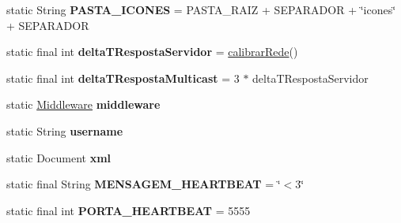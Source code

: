 \begin{DoxyCompactItemize}
\item 
\hypertarget{classutils_1_1_painel_de_controle_ab483c922061c70265c2c0833fcb01e33}{static String {\bfseries P\+A\+S\+T\+A\+\_\+\+I\+C\+O\+N\+E\+S} = P\+A\+S\+T\+A\+\_\+\+R\+A\+I\+Z + S\+E\+P\+A\+R\+A\+D\+O\+R + \char`\"{}icones\char`\"{} + S\+E\+P\+A\+R\+A\+D\+O\+R}\label{classutils_1_1_painel_de_controle_ab483c922061c70265c2c0833fcb01e33}

\item 
\hypertarget{classutils_1_1_painel_de_controle_a41ce364ac6729305e4d786d31bd540c4}{static final int {\bfseries delta\+T\+Resposta\+Servidor} = \hyperlink{classutils_1_1_painel_de_controle_a99106f0d6ede35fca232cb2af6c0f424}{calibrar\+Rede}()}\label{classutils_1_1_painel_de_controle_a41ce364ac6729305e4d786d31bd540c4}

\item 
\hypertarget{classutils_1_1_painel_de_controle_a447f2b71ddeeca09a6ab84af98d55b74}{static final int {\bfseries delta\+T\+Resposta\+Multicast} = 3 $\ast$ delta\+T\+Resposta\+Servidor}\label{classutils_1_1_painel_de_controle_a447f2b71ddeeca09a6ab84af98d55b74}

\item 
\hypertarget{classutils_1_1_painel_de_controle_a11d6a2a5de2be52c653d765cdb862945}{static \hyperlink{classmiddleware_1_1_middleware}{Middleware} {\bfseries middleware}}\label{classutils_1_1_painel_de_controle_a11d6a2a5de2be52c653d765cdb862945}

\item 
\hypertarget{classutils_1_1_painel_de_controle_a9c73df775a21b9be24006d69f40addca}{static String {\bfseries username}}\label{classutils_1_1_painel_de_controle_a9c73df775a21b9be24006d69f40addca}

\item 
\hypertarget{classutils_1_1_painel_de_controle_a3950f2120c605d1a5298673cba8454c6}{static Document {\bfseries xml}}\label{classutils_1_1_painel_de_controle_a3950f2120c605d1a5298673cba8454c6}

\item 
\hypertarget{classutils_1_1_painel_de_controle_ae38e482d2405159a25f7f355b4cda343}{static final String {\bfseries M\+E\+N\+S\+A\+G\+E\+M\+\_\+\+H\+E\+A\+R\+T\+B\+E\+A\+T} = \char`\"{}$<$3\char`\"{}}\label{classutils_1_1_painel_de_controle_ae38e482d2405159a25f7f355b4cda343}

\item 
\hypertarget{classutils_1_1_painel_de_controle_a516dafada8af0db0f3f8841956771a2b}{static final int {\bfseries P\+O\+R\+T\+A\+\_\+\+H\+E\+A\+R\+T\+B\+E\+A\+T} = 5555}\label{classutils_1_1_painel_de_controle_a516dafada8af0db0f3f8841956771a2b}


\end{DoxyCompactItemize}
